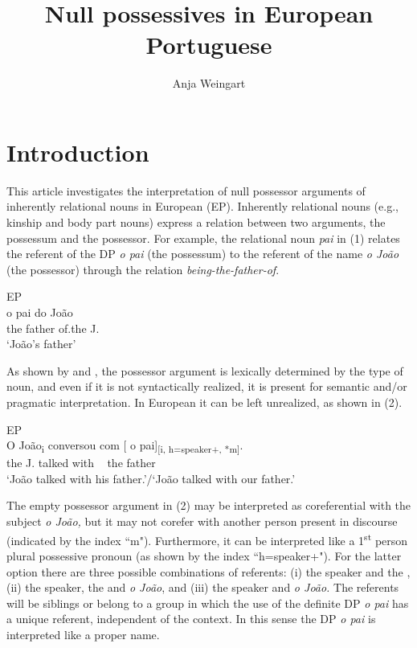 \documentclass[output=paper]{langsci/langscibook}
\author{Anja Weingart\affiliation{Georg-August-Universität Göttingen}}
\title{Null possessives in European Portuguese}
\begin{document}
\section{Introduction}%

This article investigates the interpretation of null possessor arguments of inherently relational nouns in European  (EP). Inherently relational nouns (e.g., kinship and body part nouns) express a relation between two arguments, the possessum and the possessor. For example, the relational noun \textit{pai} in (1) relates the referent of the DP \textit{o pai} (the possessum) to the referent of the name \textit{o João} (the possessor) through the relation \textit{being-the-father-of}.

\ea%
         EP\label{ex:wein:1}\\
    \gll o   pai   do   João\\
         the   father of.the   J.\\
    \glt ‘João’s father’
    \z


As shown by \citet{Barker2011} and \citet{Löbner2011}, the possessor argument is lexically determined by the type of noun, and even if it is not syntactically realized, it is present for semantic and\slash or pragmatic interpretation. In European  it can be left unrealized, as shown in (2).

\ea%
         EP\label{ex:wein:2}\\
    \gll O  João\textsubscript{i}   conversou     com [ o   pai]\textsubscript{[i, h=speaker+, *m]}.\\
         the J.     talked   with ~ the father\\
    \glt ‘João talked with his father.’\slash ‘João talked with our father.’
\z

The empty possessor argument in (2) may be interpreted as coreferential with the subject \textit{o João,} but it may not corefer with another person present in discourse (indicated by the index “m"). Furthermore, it can be interpreted like a 1\textsuperscript{st} person plural possessive pronoun (as shown by the index “h=speaker+"). For the latter option there are three possible combinations of referents: (i) the speaker and the , (ii) the speaker, the  and \textit{o João}, and (iii) the speaker and \textit{o João.} The referents will be siblings or belong to a group in which the use of the definite DP \textit{o pai} has a unique referent, independent of the context. In this sense the DP \textit{o pai} is interpreted like a proper name.
\end{document}
